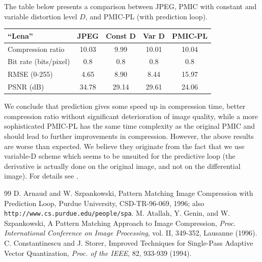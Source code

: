 The table below presents a comparison between JPEG, PMIC with constant and
variable distortion level $D$, and PMIC-PL (with prediction loop).
\begin{table}[htbp]
\begin{center}
\begin{tabular}{|l|c|c|c|c|} \hline
``{\bf Lena}''& JPEG & Const D & Var D & PMIC-PL\\ \hline
Compression ratio & 10.03 & 9.99 & 10.01 & 10.04\\ \hline
Bit rate (bits/pixel) & 0.8 & 0.8 & 0.8 & 0.8\\ \hline
RMSE (0-255) & 4.65 & 8.90 & 8.44 & 15.97\\ \hline
PSNR (dB) & 34.78 & 29.14 & 29.61 & 24.06\\ \hline
\end{tabular}
\end{center}
\end{table}
We conclude that prediction gives
some speed up in compression time, better compression ratio  
without significant deterioration of image quality, while a more
sophisticated PMIC-PL has the same time complexity as the original PMIC and
should lead to further improvements in compression. 
However,  the above results
are worse than expected. We believe they originate from
the fact that we use variable-D scheme which seems to be unsuited
for the predictive loop
(the derivative is actually done on the original image, and not
on the differential image). 
For details see \cite{as}.

\footnotesize

\begin{thebibliography}{99}
D. Arnaud and W. Szpankowski,
Pattern Matching Image Compression with Prediction Loop,
Purdue University, CSD-TR-96-069, 1996;
also {\tt http://www.cs.purdue.edu/people/spa}.
M. Atallah, Y. Genin, and W. Szpankowski,
A Pattern Matching Approach to Image Compression,
{\it Proc. International Conference on Image Processing}, vol. II,  349-352,
Lausanne (1996). 
C. Constantinescu and J. Storer,
Improved Techniques for Single-Pass Adaptive Vector
Quantization, {\it Proc. of the IEEE}, 82, 933-939 (1994).
\end{thebibliography}



